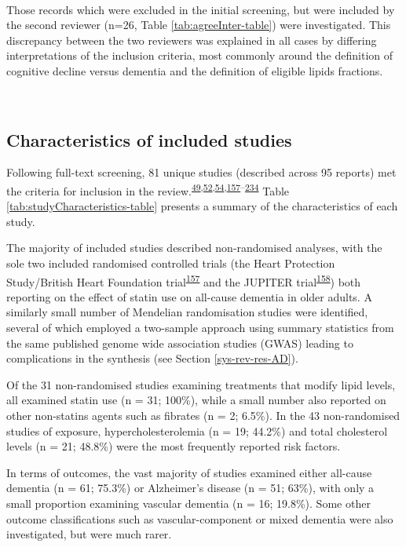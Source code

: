 \documentclass[a4paper, twoside]{templates/ociamthesis}
\begin{document}
~

Those records which were excluded in the initial screening, but were included by the second reviewer (n=26, Table \ref{tab:agreeInter-table}) were investigated. This discrepancy between the two reviewers was explained in all cases by differing interpretations of the inclusion criteria, most commonly around the definition of cognitive decline versus dementia and the definition of eligible lipids fractions.

~

\hypertarget{sys-rev-characteristics}{%
\subsection{Characteristics of included studies}\label{sys-rev-characteristics}}

Following full-text screening, 81 unique studies (described across 95 reports) met the criteria for inclusion in the review.\textsuperscript{\protect\hyperlink{ref-li2005a}{49},\protect\hyperlink{ref-tan2003a}{52},\protect\hyperlink{ref-reitz2004a}{54},\protect\hyperlink{ref-heartprotectionstudycollaborativegroup2002}{157}--\protect\hyperlink{ref-zhu2018}{234}} Table \ref{tab:studyCharacteristics-table} presents a summary of the characteristics of each study.

The majority of included studies described non-randomised analyses, with the sole two included randomised controlled trials (the Heart Protection Study/British Heart Foundation trial\textsuperscript{\protect\hyperlink{ref-heartprotectionstudycollaborativegroup2002}{157}} and the JUPITER trial\textsuperscript{\protect\hyperlink{ref-ridker2008}{158}}) both reporting on the effect of statin use on all-cause dementia in older adults. A similarly small number of Mendelian randomisation studies were identified, several of which employed a two-sample approach using summary statistics from the same published genome wide association studies (GWAS) leading to complications in the synthesis (see Section \ref{sys-rev-res-AD}).

Of the 31 non-randomised studies examining treatments that modify lipid levels, all examined statin use (n = 31; 100\%), while a small number also reported on other non-statins agents such as fibrates (n = 2; 6.5\%). In the 43 non-randomised studies of exposure, hypercholesterolemia (n = 19; 44.2\%) and total cholesterol levels (n = 21; 48.8\%) were the most frequently reported risk factors.

In terms of outcomes, the vast majority of studies examined either all-cause dementia (n = 61; 75.3\%) or Alzheimer's disease (n = 51; 63\%), with only a small proportion examining vascular dementia (n = 16; 19.8\%). Some other outcome classifications such as vascular-component or mixed dementia were also investigated, but were much rarer.
\end{document}
